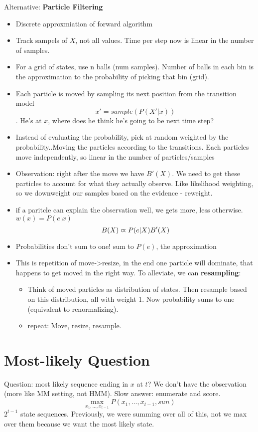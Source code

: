 Alternative: \textbf{Particle Filtering}
\begin{itemize}
\item Discrete approxmiation of forward algorithm
\item Track sampels of $X$, not all values. Time per step now is
  linear in the number of samples.
\item For a grid of states, use n balls (num samples). Number of balls in each bin is the approximation to the
  probability of picking that bin (grid).
\item Each particle is moved by sampling its next position from the
  transition model $$x' = sample(P(X'|x))$$. He's at $x$, where does he think he's going to be next time step?
\item Instead of evaluating the probability, pick at random weighted
  by the probability..Moving the particles according to the
  transitions. Each particles move independently, so linear in the
  number of particles/samples
\item Observation: right after the move we have $B'(X)$. We need to get these particles to
  account for what they actually observe. Like likelihood weighting,
  so we downweight our samples based on the evidence - reweight.
\item if a paritcle can explain the observation well, we gets more,
  less otherwise. $w(x) = P(e|x)$ $$B(X)\varpropto P(e|X)B'(X)$$
\item Probabilities don't sum to one! sum to $P(e)$, the approximation
\item This is repetition of move->resize, in the end one particle will
  dominate, that happens to get moved in the right way. To alleviate, we can \textbf{resampling}:
  \begin{itemize}
  \item Think of moved particles as distribution of states. Then
    resample based on this distribution, all with weight 1. Now
    probability sums to one (equivalent to renormalizing).
  \item repeat: Move, resize, resample.
  \end{itemize}
\end{itemize}

\section{Most-likely Question}

Question: most likely sequence ending in $x$ at $t$? We don't have the
observation (more like MM setting, not HMM).
Slow answer: enumerate and score.
$$\max_{x_1, \dots, x_{t-1}} P(x_1, \dots, x_{t-1}, sun)$$
 $2^{t-1}$ state sequences. Previously, we were summing over all of
 this, not we max over them because we want the most likely state.

